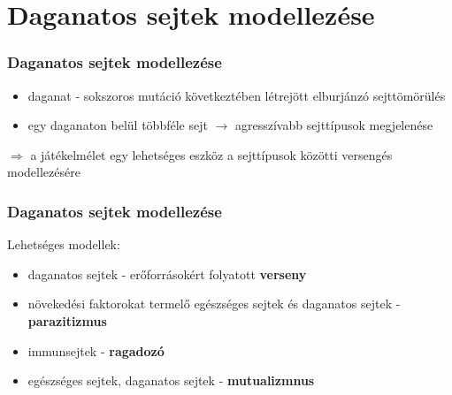 \section{Daganatos sejtek modellezése}
\begin{frame}
\frametitle{Daganatos sejtek modellezése}
\begin{itemize}
	\item daganat - sokszoros mutáció következtében létrejött elburjánzó sejttömörülés
	\item egy daganaton belül többféle sejt $\rightarrow$ agresszívabb sejttípusok megjelenése
\end{itemize}
	\begin{block}{}
	$\Rightarrow$ a játékelmélet egy lehetséges eszköz a sejttípusok közötti versengés modellezésére
\end{block}

\end{frame}

\begin{frame}
	\frametitle{Daganatos sejtek modellezése}
	Lehetséges modellek:
	\begin{itemize}
		\item daganatos sejtek - erőforrásokért folyatott \textbf{verseny}
		\item növekedési faktorokat termelő egészséges sejtek és daganatos sejtek - \textbf{parazitizmus}
		\item immunsejtek - \textbf{ragadozó}
		\item egészséges sejtek, daganatos sejtek - \textbf{mutualizmnus}
	\end{itemize}
\begin{figure}
	\centering
\end{figure}
\end{frame}

